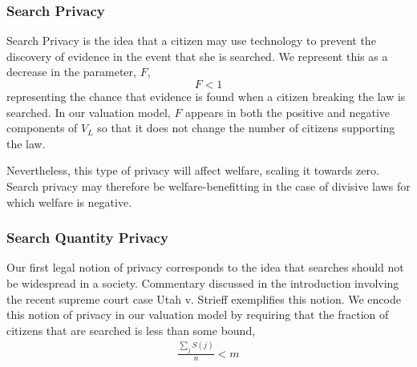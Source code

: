 \subsubsection{Search Privacy}

Search Privacy is the idea that a citizen may use technology to prevent the discovery of evidence in the event that she is searched.  We represent this as a decrease in the parameter, $F$, 
$$F<1$$
representing the chance that evidence is found when a citizen breaking the law is searched.  In our valuation model, $F$ appears in both the positive and negative components of $V_L$ so that it does not change the number of citizens supporting the law. 

Nevertheless, this type of privacy will affect welfare, scaling it towards zero.  Search privacy may therefore be welfare-benefitting in the case of divisive laws for which welfare is negative.

\subsubsection{Search Quantity Privacy}

Our first legal notion of privacy corresponds to the idea that searches should not be widespread in a society.  Commentary discussed in the introduction involving  the recent supreme court case Utah v. Strieff exemplifies this notion.
%
We encode this notion of privacy in our valuation model by requiring that the fraction of citizens that are searched is less than some bound, 
\begin{align}
\frac{\sum_j S(j)}{n} < m
\end{align}


